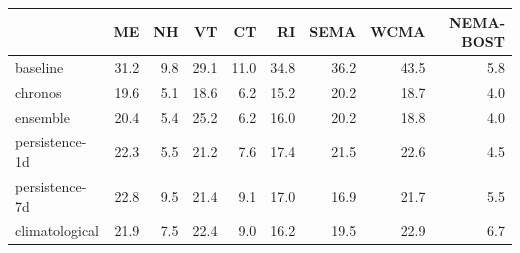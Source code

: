 \begin{tabular}{@{}lrrrrrrrr@{}}
\toprule
 & ME & NH & VT & CT & RI & SEMA & WCMA & NEMA-BOST \\
\midrule
baseline & 31.2 & 9.8 & 29.1 & 11.0 & 34.8 & 36.2 & 43.5 & 5.8 \\
chronos & 19.6 & 5.1 & 18.6 & 6.2 & 15.2 & 20.2 & 18.7 & 4.0 \\
ensemble & 20.4 & 5.4 & 25.2 & 6.2 & 16.0 & 20.2 & 18.8 & 4.0 \\
persistence-1d & 22.3 & 5.5 & 21.2 & 7.6 & 17.4 & 21.5 & 22.6 & 4.5 \\
persistence-7d & 22.8 & 9.5 & 21.4 & 9.1 & 17.0 & 16.9 & 21.7 & 5.5 \\
climatological & 21.9 & 7.5 & 22.4 & 9.0 & 16.2 & 19.5 & 22.9 & 6.7 \\
\bottomrule
\end{tabular}
